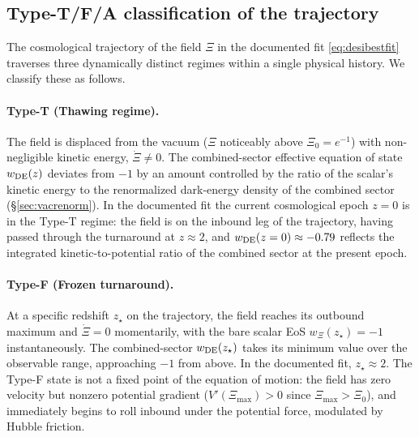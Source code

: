 
\subsection{Type-T/F/A classification of the trajectory}\label{sec:typeTFA}

The cosmological trajectory of the field $\Xi$ in the documented fit
\eqref{eq:desibestfit} traverses three dynamically distinct regimes within
a single physical history. We classify these as follows.

\paragraph{Type-T (Thawing regime).}
The field is displaced from the vacuum ($\Xi$ noticeably above $\Xi_0
= e^{-1}$) with non-negligible kinetic energy, $\dot\Xi \neq 0$. The
combined-sector effective equation of state $w_{\rm DE}(z)$ deviates
from $-1$ by an amount controlled by the ratio of the scalar's kinetic
energy to the renormalized dark-energy density of the combined sector
(\S\ref{sec:vacrenorm}). In the documented fit the current cosmological
epoch $z = 0$ is in the Type-T regime: the field is on the inbound leg
of the trajectory, having passed through the turnaround at $z \approx
2$, and $w_{\rm DE}(z = 0) \approx -0.79$ reflects the integrated
kinetic-to-potential ratio of the combined sector at the present epoch.

\paragraph{Type-F (Frozen turnaround).}
At a specific redshift $z_\star$ on the trajectory, the field reaches
its outbound maximum and $\dot\Xi = 0$ momentarily, with the bare
scalar EoS $w_\Xi(z_\star) = -1$ instantaneously. The combined-sector
$w_{\rm DE}(z_\star)$ takes its minimum value over the observable
range, approaching $-1$ from above. In the documented fit, $z_\star
\approx 2$. The Type-F state is not a fixed point of the equation of
motion: the field has zero velocity but nonzero potential gradient
($V'(\Xi_{\max}) > 0$ since $\Xi_{\max} > \Xi_0$), and immediately
begins to roll inbound under the potential force, modulated by Hubble
friction.

